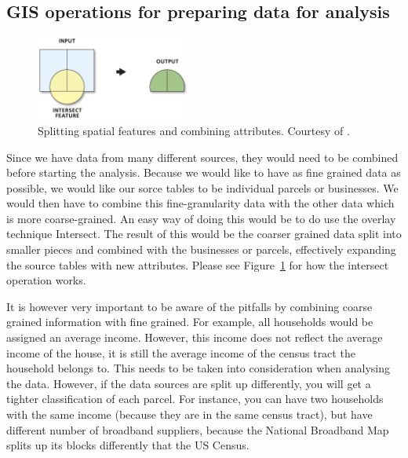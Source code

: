 \documentclass[twocolumn]{article}
\begin{document}
\subsection{GIS operations for preparing data for analysis}
\label{sub:GIS operations for combining data}
\begin{figure}
  \centering
  \includegraphics[width=0.45\textwidth]{img/intersect.png}
  \caption{Splitting spatial features and combining attributes. Courtesy of \cite{noauthor_undated-dw}.}
  \label{fig:intersect}
\end{figure}
Since we have data from many different sources, they would need to be combined before starting the analysis. Because we would like to have as fine grained data as possible, we would like our sorce tables to be individual parcels or businesses. We would then have to combine this fine-granularity data with the other data which is more coarse-grained. An easy way of doing this would be to do use the overlay technique Intersect. The result of this would be the coarser grained data split into smaller pieces and combined with the businesses or parcels, effectively expanding the source tables with new attributes. Please see Figure~\ref{fig:intersect} for how the intersect operation works.

It is however very important to be aware of the pitfalls by combining coarse grained information with fine grained. For example, all households would be assigned an average income. However, this income does not reflect the average income of the house, it is still the average income of the census tract the household belongs to. This needs to be taken into consideration when analysing the data. However, if the data sources are split up differently, you will get a tighter classification of each parcel. For instance, you can have two households with the same income (because they are in the same census tract), but have different number of broadband suppliers, because the National Broadband Map splits up its blocks differently that the US Census.
\end{document}
